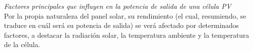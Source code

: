 \documentclass[12pt]{article}
\begin{document}
	
	
	\noindent \textit{Factores principales que influyen en la potencia de salida de una célula PV}\\
	
	\noindent Por la propia naturaleza del panel solar, su rendimiento (el cual, resumiendo, se traduce en cuál será su potencia de salida) se verá afectado por determinados factores, a destacar la radiación solar, la temperatura ambiente y la temperatura de la célula. \\
	
\end{document}
